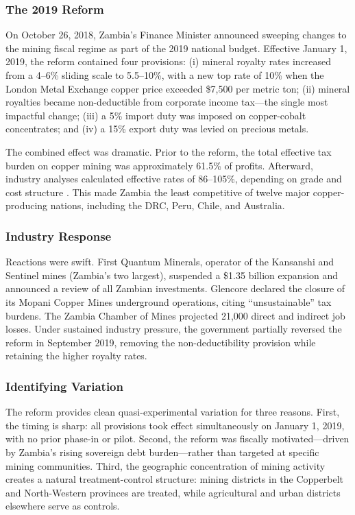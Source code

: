 \documentclass[12pt]{article}
\begin{document}
\subsubsection*{The 2019 Reform} On October 26, 2018, Zambia's Finance Minister announced sweeping changes to the mining fiscal regime as part of the 2019 national budget. Effective January 1, 2019, the reform contained four provisions: (i) mineral royalty rates increased from a 4--6\% sliding scale to 5.5--10\%, with a new top rate of 10\% when the London Metal Exchange copper price exceeded \$7,500 per metric ton; (ii) mineral royalties became non-deductible from corporate income tax---the single most impactful change; (iii) a 5\% import duty was imposed on copper-cobalt concentrates; and (iv) a 15\% export duty was levied on precious metals.

The combined effect was dramatic. Prior to the reform, the total effective tax burden on copper mining was approximately 61.5\% of profits. Afterward, industry analyses calculated effective rates of 86--105\%, depending on grade and cost structure \citep{cassel2021zambia}. This made Zambia the least competitive of twelve major copper-producing nations, including the DRC, Peru, Chile, and Australia.

\subsubsection*{Industry Response} Reactions were swift. First Quantum Minerals, operator of the Kansanshi and Sentinel mines (Zambia's two largest), suspended a \$1.35 billion expansion and announced a review of all Zambian investments. Glencore declared the closure of its Mopani Copper Mines underground operations, citing ``unsustainable'' tax burdens. The Zambia Chamber of Mines projected 21,000 direct and indirect job losses. Under sustained industry pressure, the government partially reversed the reform in September 2019, removing the non-deductibility provision while retaining the higher royalty rates.

\subsubsection*{Identifying Variation} The reform provides clean quasi-experimental variation for three reasons. First, the timing is sharp: all provisions took effect simultaneously on January 1, 2019, with no prior phase-in or pilot. Second, the reform was fiscally motivated---driven by Zambia's rising sovereign debt burden---rather than targeted at specific mining communities. Third, the geographic concentration of mining activity creates a natural treatment-control structure: mining districts in the Copperbelt and North-Western provinces are treated, while agricultural and urban districts elsewhere serve as controls.
\end{document}
